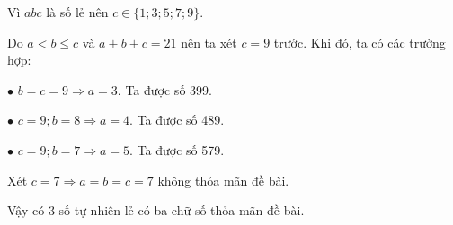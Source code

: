 \begin{Answer}{14}
		Vì $abc$ là số lẻ nên $c \in \{1; 3; 5; 7; 9\}$.
		
		Do $a < b \le c$ và $a + b + c = 21$ nên ta xét $c = 9$ trước. Khi đó, ta có các trường hợp:
		
		$\bullet$	$b = c = 9 \Rightarrow a = 3$. Ta được số 399.
		
		$\bullet$	$c = 9; b = 8 \Rightarrow a = 4$. Ta được số 489.
		
		$\bullet$	$c = 9; b = 7 \Rightarrow a = 5$. Ta được số 579.
		
		Xét $c = 7 \Rightarrow a = b = c = 7$ không thỏa mãn đề bài.
		
		Vậy có 3 số tự nhiên lẻ có ba chữ số thỏa mãn đề bài.
	
\end{Answer}
